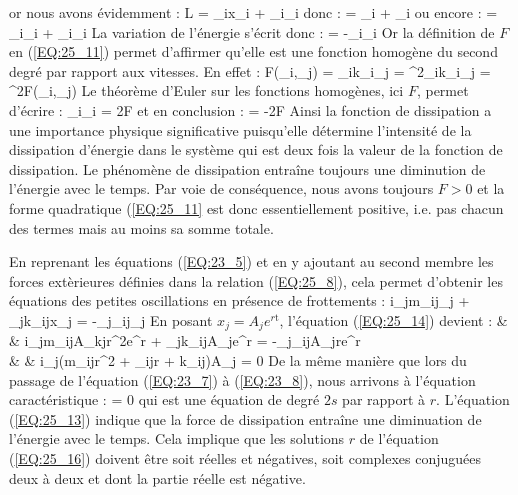 \eea
or nous avons \'{e}videmment :
\benn
	L = \sum_{i}x_{i} + \sum_{i}_{i}
\eenn
donc :
\benn
	 = \sum_{i} + \sum_{i}
\eenn
ou encore :
\benn
	 = \sum_{i}_{i} + \sum_{i}_{i}
\eenn
La variation de l'\'{e}nergie s'\'{e}crit donc :
\benn
	 = -\sum_{i}_{i}
\eenn
Or la d\'{e}finition de $F$ en (\ref{EQ:25_11}) permet d'affirmer qu'elle est une fonction homog\`{e}ne du second degr\'{e} par rapport aux vitesses. En effet :
\benn
	F(\beta{}_{i},\beta{}_{j}) = \alpha_{ik}\beta{}_{i}\beta{}_{j} = \beta^{2}\alpha_{ik}_{i}_{j} = \beta^{2}F(_{i},_{j})
\eenn
Le th\'{e}or\`{e}me d'Euler sur les fonctions homog\`{e}nes, ici $F$, permet d'\'{e}crire :
\benn
	\sum_{i}_{i} = 2F
\eenn
et en conclusion :
\be
	 = -2F \label{EQ:25_13}
\ee
Ainsi la fonction de dissipation a une importance physique significative puisqu'elle d\'{e}termine l'intensit\'{e} de la dissipation d'\'{e}nergie dans le syst\`{e}me qui est deux fois la valeur de la fonction de dissipation. Le ph\'{e}nom\`{e}ne de dissipation entra\^{i}ne toujours une diminution de l'\'{e}nergie avec le temps. Par voie de cons\'{e}quence, nous avons toujours $F > 0$ et la forme quadratique (\ref{EQ:25_11} est donc essentiellement positive, i.e. pas chacun des termes mais au moins sa somme totale.

En reprenant les \'{e}quations (\ref{EQ:23_5}) et en y ajoutant au second membre les forces ext\`{e}rieures d\'{e}finies dans la relation (\ref{EQ:25_8}), cela permet d'obtenir les \'{e}quations des petites oscillations en pr\'{e}sence de frottements :
\be
	\forall i\text{ }\sum_{j}m_{ij}_{j} + \sum_{j}k_{ij}x_{j} = -\sum_{j}\alpha_{ij}_{j} \label{EQ:25_14}
\ee
En posant $x_{j} = A_{j}e^{r\mathrm{t}}$, l'\'{e}quation (\ref{EQ:25_14}) devient :
\bea
	& & \forall i\text{ }\sum_{j}m_{ij}A_{kj}r^{2}e^{r} + \sum_{j}k_{ij}A_{j}e^{r} = -\sum_{j}\alpha_{ij}A_{j}re^{r} \nonumber \\
	& \Leftrightarrow & \forall i\text{ }\sum_{j}(m_{ij}r^{2} + \alpha_{ij}r + k_{ij})A_{j} = 0 \label{EQ:25_15}
\eea
De la m\^{e}me mani\`{e}re que lors du passage de l'\'{e}quation (\ref{EQ:23_7}) \`{a} (\ref{EQ:23_8}), nous arrivons \`{a} l'\'{e}quation caract\'{e}ristique :
\be
	 = 0 \label{EQ:25_16}
\ee
qui est une \'{e}quation de degr\'{e} $2s$ par rapport \`{a} $r$. L'\'{e}quation (\ref{EQ:25_13}) indique que la force de dissipation entra\^{i}ne une diminuation de l'\'{e}nergie avec le temps. Cela implique que les solutions $r$ de l'\'{e}quation (\ref{EQ:25_16}) doivent \^{e}tre soit r\'{e}elles et n\'{e}gatives, soit complexes conjugu\'{e}es deux \`{a} deux et dont la partie r\'{e}elle est n\'{e}gative.

